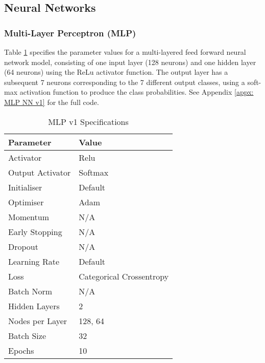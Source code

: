 

\subsection{Neural Networks}
\label{sec: Neural Networks}

\subsubsection{Multi-Layer Perceptron (MLP)}
\label{sec: MLP Neural Network v1}

Table \ref{tab:seq_nn} specifies the parameter values for a multi-layered feed forward neural network model, consisting of one input layer (128 neurons) and one hidden layer (64 neurons) using the ReLu activator function. The output layer has a subsequent 7 neurons corresponding to the 7 different output classes, using a soft-max activation function to produce the class probabilities. See Appendix \ref{appx: MLP NN v1} for the full code.

\begin{table}[h]
\captionsetup{justification=centering} 
\centering
\caption{MLP v1 Specifications}
\begin{tabular}{ll}
\hline
\textbf{Parameter} & \textbf{Value} \\ \hline
Activator & Relu \\
Output Activator & Softmax \\
Initialiser & Default \\
Optimiser & Adam \\
Momentum & N/A \\
Early Stopping & N/A \\
Dropout & N/A \\
Learning Rate & Default \\
Loss & Categorical Crossentropy \\
Batch Norm & N/A \\
Hidden Layers & 2 \\
Nodes per Layer & 128, 64 \\
Batch Size & 32 \\
Epochs & 10 \\ \hline
\end{tabular}
\label{tab:seq_nn}
\end{table}

